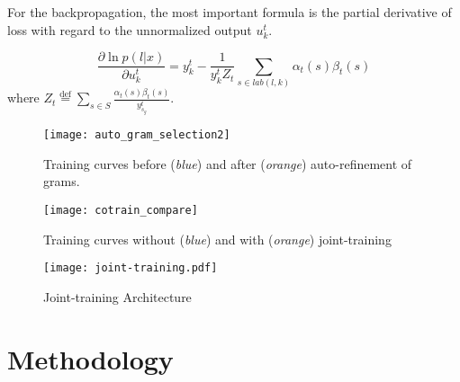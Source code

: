 \documentclass{article}
\begin{document}
For the backpropagation, the most important formula is the partial derivative of loss with regard to the unnormalized output $u^t_k$.

\begin{equation}
\frac{\partial \ln p(l|x)}{\partial u^t_k}=y^t_k-\frac{1}{y^t_k Z_t}\sum_{s\in lab(l,k)}\alpha_t(s)\beta_t(s)
\end{equation}
where $Z_t\stackrel{\text{def}}{=}\sum_{s\in S}\frac{\alpha_t(s)\beta_t(s)}{y^t_{s_g}}$.

\begin{figure*}[t]
\centering
\begin{subfigure}{.34\textwidth}
  \centering
  \texttt{[image: auto\_gram\_selection2]}
  \caption{Training curves before ({\it blue}) and after ({\it orange}) auto-refinement of grams.}
  \label{fig:gram_selection}
\end{subfigure}
\begin{subfigure}{.34\textwidth}
  \centering
  \texttt{[image: cotrain\_compare]}
  \caption{Training curves without ({\it blue}) and with ({\it orange}) joint-training}
  \label{fig:cotraining_curve}
\end{subfigure}
\begin{subfigure}{.28\textwidth}
  \centering
  \texttt{[image: joint-training.pdf]}
  \caption{Joint-training Architecture}
  \label{fig:cotraining_model}
\end{subfigure}%
\caption{(Figure \ref{fig:gram_selection}) compares the training curves before (blue) and after (orange) auto-refinement of grams. They look very similar, although the number of grams is greatly reduced after refinement, which makes training faster and potentially more robust due to less gram sparsity. Figure (\ref{fig:cotraining_curve}) Training curve of model with and without joint-training. The model corresponding to the orange training curve is jointly trained together with vanilla CTC, such models are often more stable during training. Figure (\ref{fig:cotraining_model}) Typical joint-training model architecture - vanilla CTC loss is best applied a few levels lower than the Gram-CTC loss.\\
}
\vspace{-10pt}
\label{fig:fig}
\end{figure*}


\section{Methodology}
\end{document}
